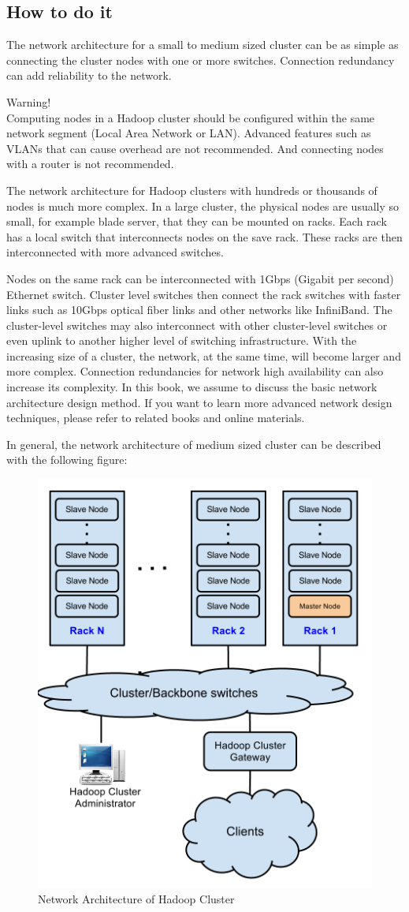 \subsection*{How to do it}
The network architecture for a small to medium sized cluster can be as simple as connecting the cluster nodes with one or more switches. Connection redundancy can add reliability to the network.
\begin{warning}
Warning! \\
Computing nodes in a Hadoop cluster should be configured within the same network segment (Local Area Network or LAN). Advanced features such as VLANs that can cause overhead are not recommended. And connecting nodes with a router is not recommended.
\end{warning}
The network architecture for Hadoop clusters with hundreds or thousands of nodes is much more complex. In a large cluster, the physical nodes are usually so small, for example blade server, that they can be mounted on racks. Each rack has a local switch that interconnects nodes on the save rack. These racks are then interconnected with more advanced switches.

Nodes on the same rack can be interconnected with 1Gbps (Gigabit per second) Ethernet switch. Cluster level switches then connect the rack switches with faster links such as 10Gbps optical fiber links and other networks like InfiniBand. The cluster-level switches may also interconnect with other cluster-level switches or even uplink to another higher level of switching infrastructure. With the increasing size of a cluster, the network, at the same time, will become larger and more complex. Connection redundancies for network high availability can also increase its complexity. In this book, we assume to discuss the basic network architecture design method. If you want to learn more advanced network design techniques, please refer to related books and online materials.

In general, the network architecture of medium sized cluster can be described with the following figure:
\begin{figure}[h]
  \centering
  \includegraphics[width=.6\textwidth]{figs/5163os_02_01.png}
  \caption{Network Architecture of Hadoop Cluster}\label{fig:network.architecture}
\end{figure} 

